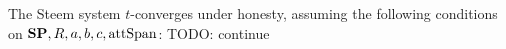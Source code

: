 \begin{theorem}
  The Steem system $t$-converges under honesty, assuming the following
  conditions on $\mathrm{\textbf{SP}}, R, a, b, c, \mathrm{attSpan}$: TODO: continue
\end{theorem}
